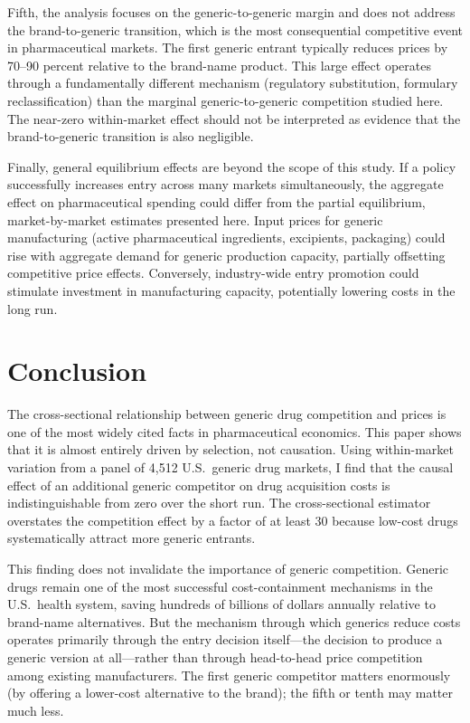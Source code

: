 \documentclass[12pt]{article}
\begin{document}
Fifth, the analysis focuses on the generic-to-generic margin and does not address the brand-to-generic transition, which is the most consequential competitive event in pharmaceutical markets. The first generic entrant typically reduces prices by 70--90 percent relative to the brand-name product. This large effect operates through a fundamentally different mechanism (regulatory substitution, formulary reclassification) than the marginal generic-to-generic competition studied here. The near-zero within-market effect should not be interpreted as evidence that the brand-to-generic transition is also negligible.

Finally, general equilibrium effects are beyond the scope of this study. If a policy successfully increases entry across many markets simultaneously, the aggregate effect on pharmaceutical spending could differ from the partial equilibrium, market-by-market estimates presented here. Input prices for generic manufacturing (active pharmaceutical ingredients, excipients, packaging) could rise with aggregate demand for generic production capacity, partially offsetting competitive price effects. Conversely, industry-wide entry promotion could stimulate investment in manufacturing capacity, potentially lowering costs in the long run.


\section{Conclusion}\label{sec:conclusion}

The cross-sectional relationship between generic drug competition and prices is one of the most widely cited facts in pharmaceutical economics. This paper shows that it is almost entirely driven by selection, not causation. Using within-market variation from a panel of 4,512 U.S.\ generic drug markets, I find that the causal effect of an additional generic competitor on drug acquisition costs is indistinguishable from zero over the short run. The cross-sectional estimator overstates the competition effect by a factor of at least 30 because low-cost drugs systematically attract more generic entrants.

This finding does not invalidate the importance of generic competition. Generic drugs remain one of the most successful cost-containment mechanisms in the U.S.\ health system, saving hundreds of billions of dollars annually relative to brand-name alternatives. But the mechanism through which generics reduce costs operates primarily through the entry decision itself---the decision to produce a generic version at all---rather than through head-to-head price competition among existing manufacturers. The first generic competitor matters enormously (by offering a lower-cost alternative to the brand); the fifth or tenth may matter much less.
\end{document}
